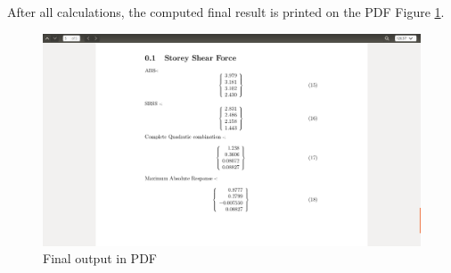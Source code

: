 After all calculations, the computed final result is printed on the PDF Figure \ref{fig:8}.
\begin{figure}[H] 
\centering \includegraphics[scale=0.31]{images/output/9.png}
\caption{Final output in PDF}
\label{fig:8}
\end{figure}
